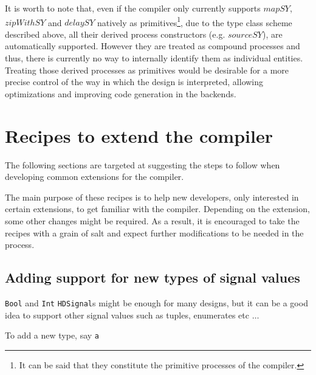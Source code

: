 It is worth to note that, even if the compiler only currently supports
$\mathit{mapSY}$, $\mathit{zipWithSY}$ and $\mathit{delaySY}$ natively
as primitives\footnote{It can be said that they constitute the
  primitive processes of the compiler.}, due to the type class scheme
described above, all their derived process constructors (e.g.
$\mathit{sourceSY}$), are automatically supported.  However they are
treated as compound processes and thus, there is currently no way to
internally identify them as individual entities.  Treating those
derived processes as primitives would be desirable for a more precise
control of the way in which the design is interpreted, allowing
optimizations and improving code generation in the backends.

\section{Recipes to extend the compiler}

The following sections are targeted at suggesting the steps to follow
when developing common extensions for the compiler. 

The main purpose of these recipes is to help new developers, only
interested in certain extensions, to get familiar with the compiler.
Depending on the extension, some other changes might be required. As a
result, it is encouraged to take the recipes with a grain of salt and
expect further modifications to be needed in the process.

\subsection{Adding support for new types of signal values}

\texttt{Bool} and \texttt{Int} \texttt{HDSignal}s might be enough for
many designs, but it can be a good idea to support other signal values such as
tuples, enumerates etc $\dots$

To add a new type, say \texttt{a}

